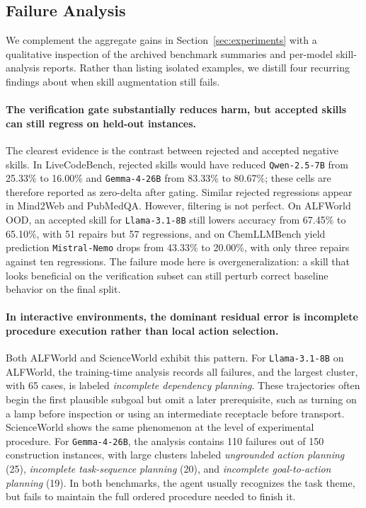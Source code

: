 \documentclass{article}
\begin{document}
\subsection{Failure Analysis}
\label{app:failure-analysis}

We complement the aggregate gains in Section~\ref{sec:experiments} with a qualitative inspection of the archived benchmark summaries and per-model skill-analysis reports. Rather than listing isolated examples, we distill four recurring findings about when skill augmentation still fails.

\paragraph{\textbf{The verification gate substantially reduces harm, but accepted skills can still regress on held-out instances.}}
The clearest evidence is the contrast between rejected and accepted negative skills. In LiveCodeBench, rejected skills would have reduced \texttt{Qwen-2.5-7B} from 25.33\% to 16.00\% and \texttt{Gemma-4-26B} from 83.33\% to 80.67\%; these cells are therefore reported as zero-delta after gating. Similar rejected regressions appear in Mind2Web and PubMedQA. However, filtering is not perfect. On ALFWorld OOD, an accepted skill for \texttt{Llama-3.1-8B} still lowers accuracy from 67.45\% to 65.10\%, with 51 repairs but 57 regressions, and on ChemLLMBench yield prediction \texttt{Mistral-Nemo} drops from 43.33\% to 20.00\%, with only three repairs against ten regressions. The failure mode here is overgeneralization: a skill that looks beneficial on the verification subset can still perturb correct baseline behavior on the final split.

\paragraph{\textbf{In interactive environments, the dominant residual error is incomplete procedure execution rather than local action selection.}}
Both ALFWorld and ScienceWorld exhibit this pattern. For \texttt{Llama-3.1-8B} on ALFWorld, the training-time analysis records all failures, and the largest cluster, with 65 cases, is labeled \emph{incomplete dependency planning}. These trajectories often begin the first plausible subgoal but omit a later prerequisite, such as turning on a lamp before inspection or using an intermediate receptacle before transport. ScienceWorld shows the same phenomenon at the level of experimental procedure. For \texttt{Gemma-4-26B}, the analysis contains 110 failures out of 150 construction instances, with large clusters labeled \emph{ungrounded action planning} (25), \emph{incomplete task-sequence planning} (20), and \emph{incomplete goal-to-action planning} (19). In both benchmarks, the agent usually recognizes the task theme, but fails to maintain the full ordered procedure needed to finish it.
\end{document}
